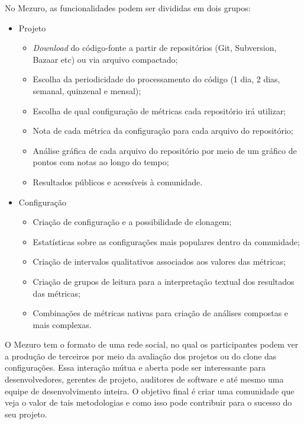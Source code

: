 \documentclass{llncs}
\begin{document}
No Mezuro, as funcionalidades podem ser divididas em dois grupos:

\begin{itemize}
  \item Projeto
    \begin{itemize}
    \item \textit{Download} do código-fonte a partir de repositórios (Git, Subversion, Bazaar etc) ou via arquivo compactado;
        \item Escolha da periodicidade do processamento do código (1 dia, 2 dias, semanal, quinzenal e mensal);
        \item Escolha de qual configuração de métricas cada repositório irá utilizar;
        \item Nota de cada métrica da configuração para cada arquivo do repositório;
        \item Análise gráfica de cada arquivo do repositório por meio de um gráfico de pontos com notas ao longo do tempo;
        \item Resultados públicos e acessíveis à comunidade.
    \end{itemize}
    \item Configuração
    \begin{itemize}
    \item Criação de configuração e a possibilidade de clonagem;
        \item Estatísticas sobre as configurações mais populares dentro da comunidade;
        \item Criação de intervalos qualitativos associados aos valores das métricas;
        \item Criação de grupos de leitura para a interpretação textual dos resultados das métricas;
        \item Combinações de métricas nativas para criação de análises compostas e mais complexas.
    \end{itemize}
\end{itemize}


O Mezuro tem o formato de uma rede social, no qual os participantes podem ver a
produção de terceiros por meio da avaliação dos projetos ou do clone das
configurações. Essa interação mútua e aberta pode ser interessante para
desenvolvedores, gerentes de projeto, auditores de software e até
mesmo uma equipe de desenvolvimento inteira. O objetivo final é criar uma
comunidade que veja o valor de tais metodologias e como isso pode contribuir
para o sucesso do seu projeto.
\end{document}
